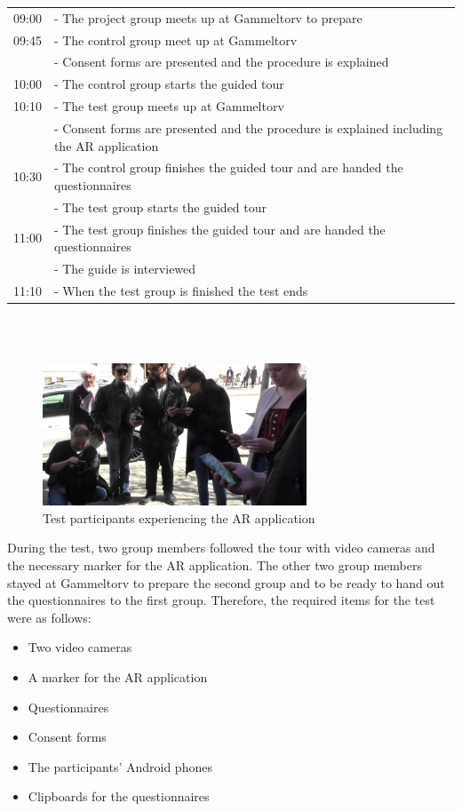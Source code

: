 \begin{tabular}{l p{12cm}}
09:00 & - The project group meets up at Gammeltorv to prepare \\
09:45 & - The control group meet up at Gammeltorv \\
 & - Consent forms are presented and the procedure is explained \\
10:00 &   - The control group starts the guided tour \\
10:10 & - The test group meets up at Gammeltorv \\
 & - Consent forms are presented and the procedure is explained including the AR application \\
10:30 & - The control group finishes the guided tour and are handed the questionnaires \\
 & - The test group starts the guided tour
\\ 
11:00 & - The test group finishes the guided tour and are handed the questionnaires \\
 & - The guide is interviewed \\
11:10 & - When the test group is finished the test ends \\
\end{tabular}\\
\\

\begin{figure}[h!]
   \centering
   \includegraphics[width=0.7\textwidth]{figures/participants_app.png}
   \caption{Test participants experiencing the AR application}\label{fig:participants_app}
\end{figure}

During the test, two group members followed the tour with video cameras and the necessary marker for the AR application. The other two group members stayed at Gammeltorv to prepare the second group and to be ready to hand out the questionnaires to the first group. Therefore, the required items for the test were as follows:

\begin{itemize}
\item Two video cameras
\item A marker for the AR application
\item Questionnaires
\item Consent forms
\item The participants’ Android phones
\item Clipboards for the questionnaires
\end{itemize}

